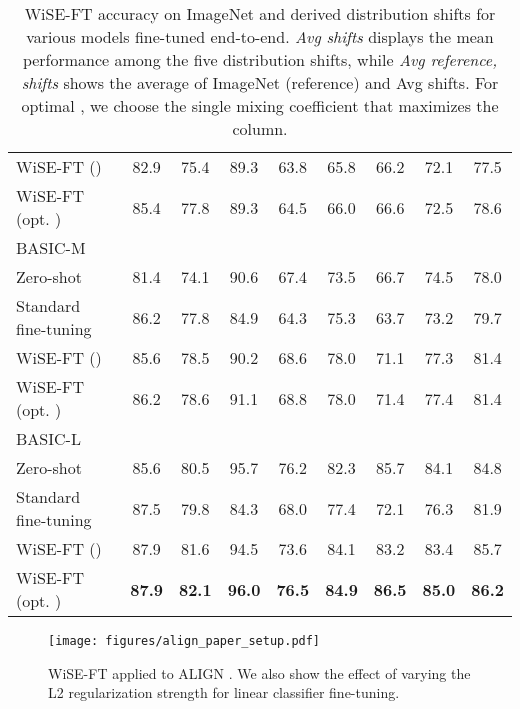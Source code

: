 \begin{table*}
\begin{center}
\begin{tabular}{lc|ccccc|cc}
\quad WiSE-FT () & 82.9 & 75.4 &  89.3 & 63.8 & 65.8 & 66.2 & 72.1 & 77.5 \\
\quad WiSE-FT (opt. ) & 85.4 & 77.8 & 89.3 & 64.5 & 66.0 & 66.6 & 72.5 &  78.6 \\
BASIC-M \cite{pham2021scaling} &  &  &  &  &  &  &  &  \\
\quad Zero-shot & 81.4 & 74.1 & 90.6 & 67.4 & 73.5 & 66.7 & 74.5 & 78.0 \\
\quad Standard fine-tuning & 86.2 & 77.8 & 84.9 & 64.3 & 75.3 & 63.7 & 73.2 & 79.7 \\
\quad WiSE-FT () & 85.6 & 78.5 & 90.2 & 68.6 & 78.0 & 71.1 & 77.3 & 81.4 \\
\quad WiSE-FT (opt. ) & 86.2 & 78.6 & 91.1 & 68.8 & 78.0 & 71.4 & 77.4 &  81.4 \\
BASIC-L \cite{pham2021scaling} &  &  &  &  &  &  &  &  \\
\quad Zero-shot & 85.6 & 80.5 & 95.7 & 76.2 & 82.3 & 85.7 & 84.1 & 84.8 \\
\quad Standard fine-tuning & 87.5 & 79.8 & 84.3 & 68.0 & 77.4 & 72.1 & 76.3 & 81.9 \\
\quad WiSE-FT () & 87.9 & 81.6 & 94.5 & 73.6 & 84.1 & 83.2 & 83.4 & 85.7 \\
\quad WiSE-FT (opt. ) & \textbf{87.9} & \textbf{82.1} & \textbf{96.0} & \textbf{76.5} & \textbf{84.9} & \textbf{86.5} & \textbf{85.0} &  \textbf{86.2} \\
\bottomrule
\end{tabular}
\caption{\label{tab:merged}
WiSE-FT accuracy on ImageNet and derived distribution shifts for various models fine-tuned end-to-end. \textit{Avg shifts} displays the mean performance among the five distribution shifts, while \textit{Avg reference, shifts} shows the average of ImageNet (reference) and Avg shifts. For optimal , we choose the single mixing coefficient that maximizes the column.
}
\end{center}
\end{table*}


\begin{figure*}
    \centering
    \texttt{[image: figures/align\_paper\_setup.pdf]}
    \caption{WiSE-FT applied to ALIGN \cite{jia2021scaling}. We also show the effect of varying the L2 regularization strength for linear classifier fine-tuning.}
    \label{fig:align}
\end{figure*}


